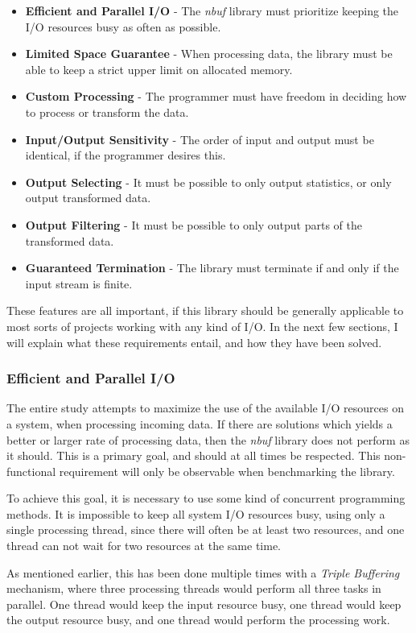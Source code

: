 \documentclass[a4paper]{article}
\newcommand{\nbuf}{\textit{nbuf} }
\begin{document}
\begin{itemize}
\item \textbf{Efficient and Parallel I/O} - The \nbuf library must prioritize keeping the I/O resources busy as often as possible.
\item \textbf{Limited Space Guarantee} - When processing data, the library must be able to keep a strict upper limit on allocated memory.
\item \textbf{Custom Processing} - The programmer must have freedom in deciding how to process or transform the data.
\item \textbf{Input/Output Sensitivity} - The order of input and output must be identical, if the programmer desires this.
\item \textbf{Output Selecting} - It must be possible to only output statistics, or only output transformed data.
\item \textbf{Output Filtering} - It must be possible to only output parts of the transformed data.
\item \textbf{Guaranteed Termination} - The library must terminate if and only if the input stream is finite.
\end{itemize}

These features are all important, if this library should be generally applicable to most sorts of projects working with any kind of I/O. In the next few sections, I will explain what these requirements entail, and how they have been solved.

\subsubsection{Efficient and Parallel I/O}
The entire study attempts to maximize the use of the available I/O resources on a system, when processing incoming data. If there are solutions which yields a better or larger rate of processing data, then the \nbuf library does not perform as it should. This is a primary goal, and should at all times be respected. This non-functional requirement will only be observable when benchmarking the library.

To achieve this goal, it is necessary to use some kind of concurrent programming methods. It is impossible to keep all system I/O resources busy, using only a single processing thread, since there will often be at least two resources, and one thread can not wait for two resources at the same time. 

As mentioned earlier, this has been done multiple times with a \textit{Triple Buffering} mechanism, where three processing threads would perform all three tasks in parallel. One thread would keep the input resource busy, one thread would keep the output resource busy, and one thread would perform the processing work.\\
 
\end{document}
